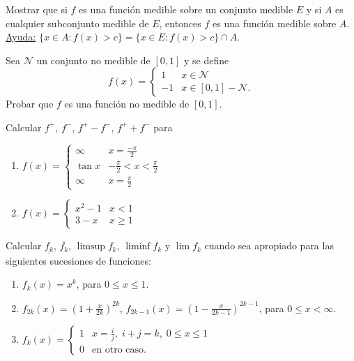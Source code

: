 \documentclass{book}
\begin{document}
\begin{ejer}{} 
Mostrar que si $f$ es una funci\'on  medible sobre un conjunto medible $E$ y si $A$ es cualquier subconjunto medible de $E$, entonces $f$ es una funci\'on medible sobre $A$.
\\
\underline{Ayuda:}  $\{x \in A: f(x)>c \}=\{ x\in E: f(x)>c\}\cap A.$
\end{ejer}

\begin{ejer}{} 
Sea $\mathcal{N}$ un conjunto no medible de $[0,1]$ y se define
\[
f(x)=\left\{
\begin{array}{rl}
1&x\in \mathcal{N}
\\
-1&x\in [0,1]-\mathcal{N}.
\end{array}
\right.
\]
Probar que $f$ es una funci\'on no medible de $[0,1]$.
\end{ejer}

\begin{ejer}{} 
Calcular $f^+$, $f^-$, $f^+-f^-$, $f^{+} + f^-$ para
\begin{enumerate}
\item 
$f(x)=\left\{
\begin{array}{lc}
\infty&x=\frac{-\pi}{2}
\\
\tan x &-\frac{\pi}{2}<x<\frac{\pi}{2}
\\
\infty&x=\frac{\pi}{2}
\end{array}
\right.$
\item $f(x)=\left\{
\begin{array}{ll}
x^2-1&x<1
\\
3-x&x\geq 1
\end{array}
\right.$
\end{enumerate}
\end{ejer}


\begin{ejer}
Calcular $\underline{f_k}$, $\overline{f_k}$, $\limsup f_k$, $\liminf f_k$ y $\lim f_k$ cuando sea
apropiado para las siguientes sucesiones de funciones:
\begin{enumerate}
\item
$f_k(x)=x^k$, para $0\leq x\leq 1.$
\item $f_{2k}(x)=\left(1+\frac{x}{2k}\right)^{2k}$, $f_{2k-1}(x)=\left(1-\frac{x}{2k-1}\right)^{2k-1}$, para $0\leq x<\infty$.
\item $f_k(x)=\left\{ 
\begin{array}{ll}
1&x=\frac{i}{j}, \;i+j=k,\; 0\leq x\leq 1
\\
0& \mbox{en otro caso.}
\end{array}
\right.$
\end{enumerate}
\end{ejer}
\end{document}
